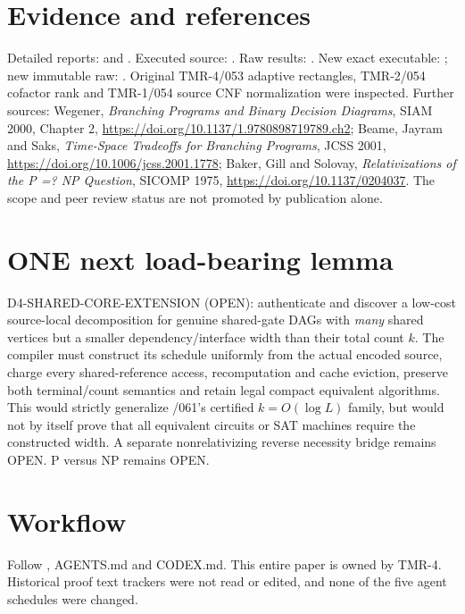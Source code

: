 \documentclass[11pt]{article}
\begin{document}
\section{Evidence and references}
Detailed reports:  and .
Executed source: .
Raw results: . New exact executable: ; new immutable raw: .
Original TMR-4/053 adaptive rectangles, TMR-2/054 cofactor rank and TMR-1/054 source CNF normalization were inspected. Further sources: Wegener, \emph{Branching Programs and Binary Decision Diagrams}, SIAM 2000, Chapter 2, \url{https://doi.org/10.1137/1.9780898719789.ch2}; Beame, Jayram and Saks, \emph{Time-Space Tradeoffs for Branching Programs}, JCSS 2001, \url{https://doi.org/10.1006/jcss.2001.1778}; Baker, Gill and Solovay, \emph{Relativizations of the P =? NP Question}, SICOMP 1975, \url{https://doi.org/10.1137/0204037}. The scope and peer review status are not promoted by publication alone.

\section{ONE next load-bearing lemma}
D4-SHARED-CORE-EXTENSION (OPEN): authenticate and discover a
low-cost source-local decomposition for genuine shared-gate
DAGs with \emph{many} shared vertices but a smaller
dependency/interface width than their total count $k$.
The compiler must construct its schedule uniformly from the
actual encoded source, charge every shared-reference access,
recomputation and cache eviction, preserve both terminal/count
semantics and retain legal compact equivalent algorithms.
This would strictly generalize /061's certified
$k=O(\log L)$ family, but would not by itself prove that
all equivalent circuits or SAT machines require the
constructed width. A separate nonrelativizing reverse
necessity bridge remains OPEN. P versus NP remains OPEN.

\section{Workflow}
Follow , AGENTS.md and CODEX.md. This entire paper is owned by TMR-4. Historical proof text trackers were not read or edited, and none of the five agent schedules were changed.
\end{document}
